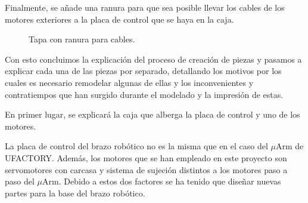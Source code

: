 Finalmente, se añade una ranura para que sea posible llevar los cables de los motores exteriores a la placa de control que se haya en la caja.

\begin{figure}[H]
    \centering
    \caption{Tapa con ranura para cables.}
    \label{fig:ranura_cables_tapa_superior}
\end{figure}

Con esto concluimos la explicación del proceso de creación de piezas y pasamos a explicar cada una de las piezas por separado, detallando los motivos por los cuales es necesario remodelar algunas de ellas y los inconvenientes y contratiempos que han surgido durante el modelado y la impresión de estas.

En primer lugar, se explicará la caja que alberga la placa de control y uno de los motores.

La placa de control del brazo robótico no es la misma que en el caso del $\mu$Arm de UFACTORY. Además, los motores que se han empleado en este proyecto son servomotores con carcasa y sistema de sujeción distintos a los motores paso a paso del $\mu$Arm. Debido a estos dos factores se ha tenido que diseñar nuevas partes para la base del brazo robótico.

